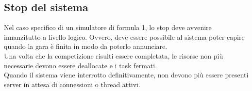 \subsection{Stop del sistema}
Nel caso specifico di un simulatore di formula 1, lo stop deve avvenire innanzitutto a livello logico. Ovvero, deve essere
possibile al sistema poter capire quando la gara è finita in modo da poterlo annunciare.\\
Una volta che la competizione risulti essere completata, le risorse non più necessarie devono essere deallocate e i task
fermati.\\
Quando il sistema viene interrotto definitivamente, non devono più essere presenti server in attesa di connessioni o
thread attivi.